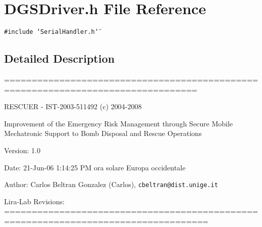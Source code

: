 \section{DGSDriver.h File Reference}
\label{DGSDriver_8h}
 


{\tt \#include \char`\"{}Serial\-Handler.h\char`\"{}}\par


\subsection{Detailed Description}
=================================================================================

RESCUER - IST-2003-511492 (c) 2004-2008

Improvement of the Emergency Risk Management through Secure Mobile Mechatronic Support to Bomb Disposal and Rescue Operations

\begin{Desc}
\item[Version:]1.0 \end{Desc}
\begin{Desc}
\item[Date:]21-Jun-06 1:14:25 PM ora solare Europa occidentale \end{Desc}
\begin{Desc}
\item[Author:]Carlos Beltran Gonzalez (Carlos), {\tt cbeltran@dist.unige.it} 

Lira-Lab Revisions: ===================================================================================\end{Desc}
